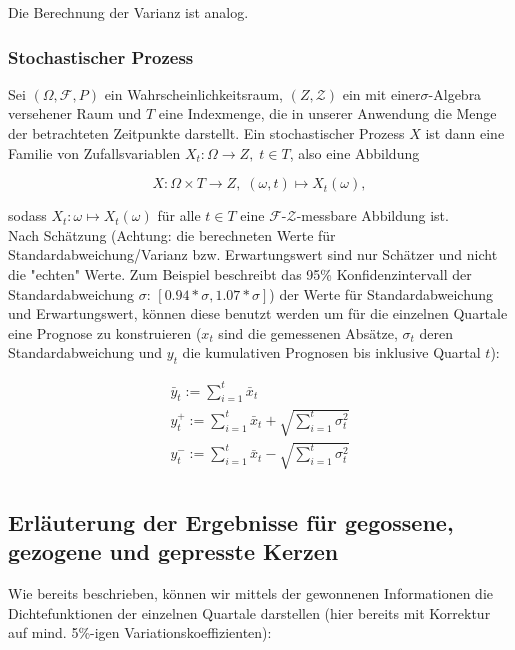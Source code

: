 \documentclass[a4paper,11pt]{article}
\begin{document}
Die Berechnung der Varianz ist analog.

\subsubsection{Stochastischer Prozess}

Sei $(\Omega ,{\mathcal {F}},P)$ ein Wahrscheinlichkeitsraum, $(Z,{\mathcal {Z}})$ ein mit einer$\sigma$-Algebra versehener Raum und $T$ eine Indexmenge, die in unserer Anwendung die Menge der betrachteten Zeitpunkte darstellt. Ein stochastischer Prozess $X$ ist dann eine Familie von Zufallsvariablen $X_t \colon \Omega \to Z,\;t\in T$, also eine Abbildung

\begin{equation}
X\colon \Omega \times T\to Z,\;(\omega ,t)\mapsto X_{t}(\omega ),
\end{equation}

sodass $X_{t}\colon \omega \mapsto X_{t}(\omega )$ für alle $t\in T$ eine ${\mathcal {F}}$-${\mathcal {Z}}$-messbare Abbildung ist.\\

Nach Schätzung (Achtung: die berechneten Werte für Standardabweichung/Varianz bzw. Erwartungswert sind nur Schätzer und nicht die "echten" Werte. Zum Beispiel beschreibt das 95\% Konfidenzintervall der Standardabweichung $\sigma$: $[0.94*\sigma, 1.07*\sigma]$\cite{sdci}) der Werte für Standardabweichung und Erwartungswert, können diese benutzt werden um für die einzelnen Quartale eine Prognose zu konstruieren ($x_t$ sind die gemessenen Absätze, $\sigma_t$ deren Standardabweichung und $y_t$ die kumulativen Prognosen bis inklusive Quartal $t$):

\begin{eqnarray}
	\bar{y}_t := \sum_{i=1}^{t} \bar{x}_t\\
	y_t^+ := \sum_{i=1}^{t} \bar{x}_t + \sqrt{\sum_{i=1}^{t} \sigma_t^2}\\
	y_t^- := \sum_{i=1}^{t} \bar{x}_t - \sqrt{\sum_{i=1}^{t} \sigma_t^2}\\
\end{eqnarray}

\newpage
\subsection{Erläuterung der Ergebnisse für gegossene, gezogene und gepresste Kerzen}

Wie bereits beschrieben, können wir mittels der gewonnenen Informationen die Dichtefunktionen der einzelnen Quartale darstellen (hier bereits mit Korrektur auf mind. 5\%-igen Variationskoeffizienten):
\end{document}
